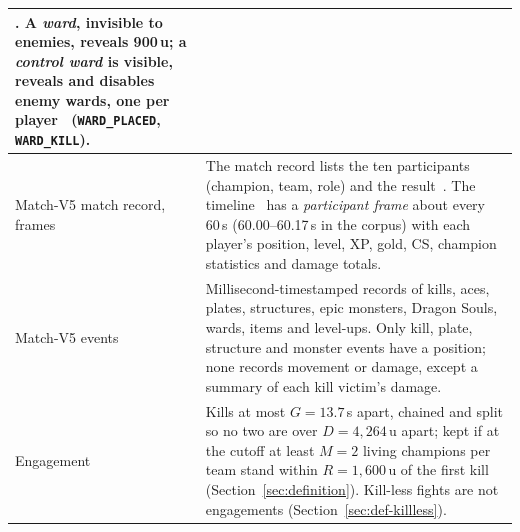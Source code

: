 \begin{table}[!t]
\begin{tabularx}{\textwidth}{@{}>{\raggedright\arraybackslash}p{2.35cm}X@{}}
{  war}. A \emph{ward}, invisible to enemies, reveals 900\,u; a \emph{control ward} is visible, reveals and disables enemy
  wards, one per player~\cite{lolwiki2026sight,lolwiki2025ward} (\texttt{WARD\_PLACED},
  \texttt{WARD\_KILL}). \\
\midrule
Match-V5 match record, frames &
  The match record lists the ten participants (champion, team, role) and the
  result~\cite{riotapi2024matchv5}. The timeline~\cite{riotapi2024timeline} has a \emph{participant frame}
  about every 60\,s (60.00--60.17\,s in the corpus) with each player's position, level, XP, gold, CS, champion
  statistics and damage totals. \\
Match-V5 events &
  Millisecond-timestamped records of kills, aces, plates, structures, epic monsters, Dragon Souls, wards,
  items and level-ups. Only kill, plate, structure and monster events have a position; none records
  movement or damage, except a summary of each kill victim's damage. \\
\midrule
Engagement &
  Kills at most $G = 13.7$\,s apart, chained and split so no two are over $D = 4{,}264$\,u apart; kept if
  at the cutoff at least $M = 2$ living champions per team stand within $R = 1{,}600$\,u of the first kill
  (Section~\ref{sec:definition}). Kill-less fights are not engagements (Section~\ref{sec:def-killless}). \\

\end{tabularx}
\end{table}
